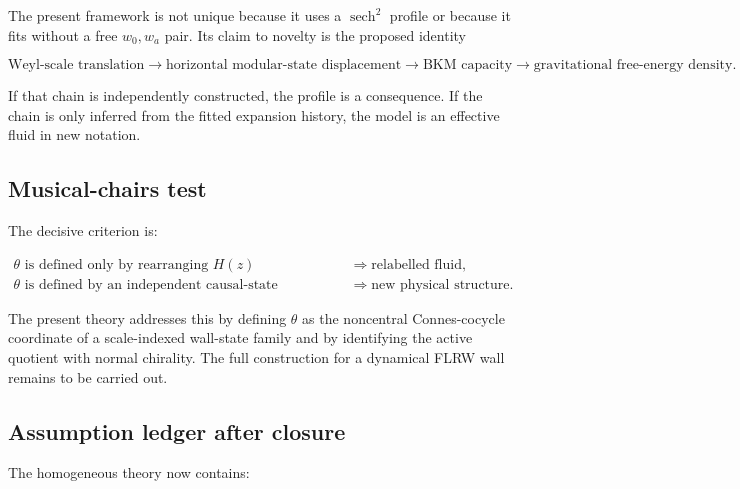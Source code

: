\documentclass[
  11pt,
  letterpaper,
]{article}
\begin{document}
The present framework is not unique because it uses a
\(\operatorname{sech}^2\) profile or because it fits without a free
\(w_0,w_a\) pair. Its claim to novelty is the proposed identity

\[
\boxed{
\text{Weyl-scale translation}
\longrightarrow
\text{horizontal modular-state displacement}
\longrightarrow
\text{BKM capacity}
\longrightarrow
\text{gravitational free-energy density}.
}
\]

If that chain is independently constructed, the profile is a
consequence. If the chain is only inferred from the fitted expansion
history, the model is an effective fluid in new notation.

\subsection{Musical-chairs test}\label{musical-chairs-test}

The decisive criterion is:

\[
\boxed{
\begin{array}{ll}
\theta\text{ is defined only by rearranging }H(z)
&\Rightarrow\text{relabelled fluid},\\[1mm]
\theta\text{ is defined by an independent causal-state construction}
&\Rightarrow\text{new physical structure}.
\end{array}}
\]

The present theory addresses this by defining \(\theta\) as the
noncentral Connes-cocycle coordinate of a scale-indexed wall-state
family and by identifying the active quotient with normal chirality. The
full construction for a dynamical FLRW wall remains to be carried out.

\subsection{Assumption ledger after
closure}\label{assumption-ledger-after-closure}

The homogeneous theory now contains:
\end{document}
